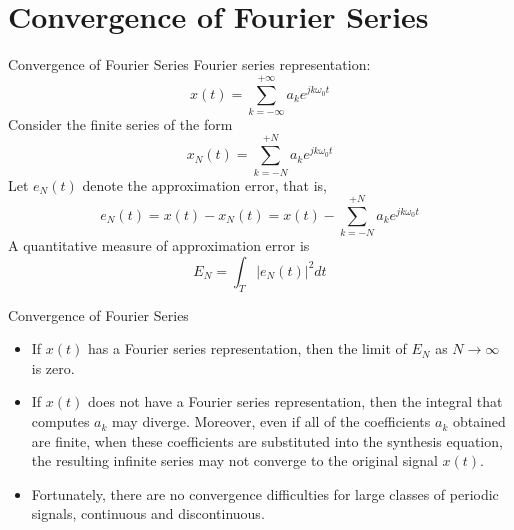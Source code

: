 \section{Convergence of Fourier Series}

\begin{frame}{Convergence of Fourier Series}
    Fourier series representation:
    \begin{equation*}
            x(t) = \sum_{k=-\infty}^{+\infty}a_k e^{jk\omega_0 t}
    \end{equation*}
    Consider the \alert{finite} series of the form
    \begin{equation*}
            x_N(t) = \sum_{k=-N}^{+N}a_k e^{jk\omega_0 t}
    \end{equation*}
    Let $e_N(t)$ denote the approximation error, that is,
    \begin{equation*}
            e_N(t) = x(t) - x_N(t) = x(t) - \sum_{k=-N}^{+N}a_k e^{jk\omega_0 t}
    \end{equation*}
    A quantitative measure of approximation error is
    \begin{equation*}
        E_N = \int_T \left|e_N(t)\right|^2 dt
    \end{equation*}


\end{frame}


\begin{frame}{Convergence of Fourier Series}
    \begin{itemize}[<+->]
        \item If $x(t)$ has a Fourier series representation, then the limit of $E_N$ as $N \rightarrow \infty$ is zero.
        \item If $x(t)$ does not have a Fourier series representation, then the integral that computes $a_k$ may diverge. Moreover, even if all of the coefficients $a_k$ obtained  are finite, when these coefficients are substituted into the synthesis equation, the resulting infinite series may not converge to the original signal $x(t)$.
        \item Fortunately, there are no convergence difficulties for large classes of periodic signals, continuous and discontinuous.
    \end{itemize}


\end{frame}


